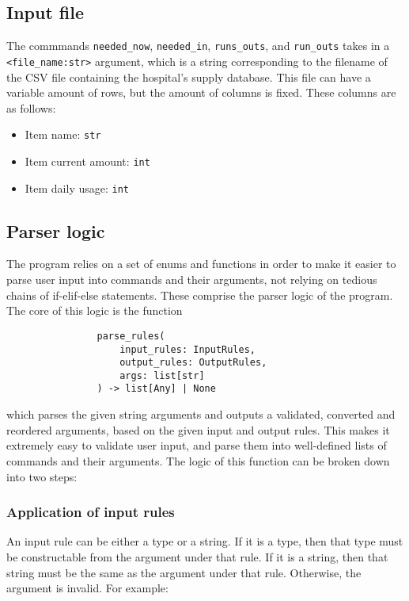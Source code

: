 \documentclass{article}
\begin{document}
		\subsection{Input file}\label{input-file}
			The commmands \verb|needed_now|, \verb|needed_in|, \verb|runs_outs|, and
			\verb|run_outs| takes in a \verb|<file_name:str>| argument, which is a
			string corresponding to the filename of the CSV file containing the hospital's
			supply database. This file can have a variable amount of rows, but the amount of
			columns is fixed. These columns are as follows:

			\begin{itemize}
				\item Item name: \verb|str|
				\item Item current amount: \verb|int|
				\item Item daily usage: \verb|int|
			\end{itemize}

		\subsection{Parser logic}\label{parser-logic}
			The program relies on a set of enums and functions in order to make it
			easier to parse user input into commands and their arguments, not relying on tedious
			chains of if-elif-else statements. These comprise the parser logic of the program.
			The core of this logic is the function

			\begin{verbatim}
				parse_rules(
					input_rules: InputRules,
					output_rules: OutputRules,
					args: list[str]
				) -> list[Any] | None
			\end{verbatim}

			which parses the given string arguments and outputs a validated, converted and
			reordered arguments, based on the given input and output rules. This makes it
			extremely easy to validate user input, and parse them into well-defined lists
			of commands and their arguments. The logic of this function can be broken down into
			two steps:

			\subsubsection{Application of input rules}
				An input rule can be either a type or a string. If it is a type, then that type
				must be constructable from the argument under that rule. If it is a string, then
				that string must be the same as the argument under that rule. Otherwise, the
				argument is invalid. For example:
\end{document}
